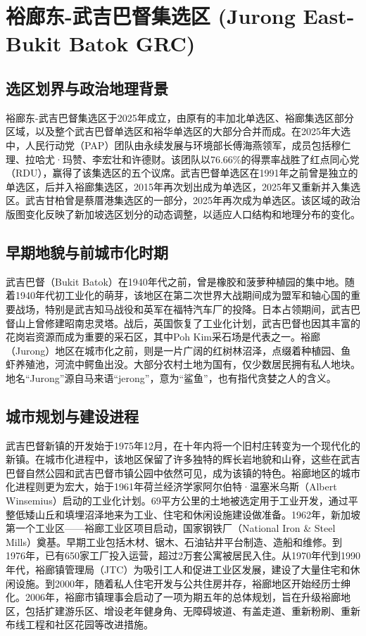 \documentclass[11pt,a4paper,twoside,openany]{book}
\begin{document}
\chapter{裕廊东-武吉巴督集选区 (Jurong East-Bukit Batok GRC)}

\section{选区划界与政治地理背景}
裕廊东-武吉巴督集选区于2025年成立，由原有的丰加北单选区、裕廊集选区部分区域，以及整个武吉巴督单选区和裕华单选区的大部分合并而成。在2025年大选中，人民行动党（PAP）团队由永续发展与环境部长傅海燕领军，成员包括穆仁理、拉哈尤·玛赞、李宏壮和许德财。该团队以76.66\%的得票率战胜了红点同心党（RDU），赢得了该集选区的五个议席。武吉巴督单选区在1991年之前曾是独立的单选区，后并入裕廊集选区，2015年再次划出成为单选区，2025年又重新并入集选区。武吉甘柏曾是蔡厝港集选区的一部分，2025年再次成为单选区。该区域的政治版图变化反映了新加坡选区划分的动态调整，以适应人口结构和地理分布的变化。

\section{早期地貌与前城市化时期}
武吉巴督（Bukit Batok）在1940年代之前，曾是橡胶和菠萝种植园的集中地。随着1940年代初工业化的萌芽，该地区在第二次世界大战期间成为盟军和轴心国的重要战场，特别是武吉知马战役和英军在福特汽车厂的投降。日本占领期间，武吉巴督山上曾修建昭南忠灵塔。战后，英国恢复了工业化计划，武吉巴督也因其丰富的花岗岩资源而成为重要的采石区，其中Poh Kim采石场是代表之一。裕廊（Jurong）地区在城市化之前，则是一片广阔的红树林沼泽，点缀着种植园、鱼虾养殖池，河流中鳄鱼出没。大部分农村土地为国有，仅少数居民拥有私人地块。地名“Jurong”源自马来语“jerong”，意为“鲨鱼”，也有指代贪婪之人的含义。

\section{城市规划与建设进程}
武吉巴督新镇的开发始于1975年12月，在十年内将一个旧村庄转变为一个现代化的新镇。在城市化进程中，该地区保留了许多独特的辉长岩地貌和山脊，这些在武吉巴督自然公园和武吉巴督市镇公园中依然可见，成为该镇的特色。裕廊地区的城市化进程则更为宏大，始于1961年荷兰经济学家阿尔伯特·温塞米乌斯（Albert Winsemius）启动的工业化计划。69平方公里的土地被选定用于工业开发，通过平整低矮山丘和填埋沼泽地来为工业、住宅和休闲设施建设做准备。1962年，新加坡第一个工业区——裕廊工业区项目启动，国家钢铁厂（National Iron \& Steel Mills）奠基。早期工业包括木材、锯木、石油钻井平台制造、造船和维修。到1976年，已有650家工厂投入运营，超过2万套公寓被居民入住。从1970年代到1990年代，裕廊镇管理局（JTC）为吸引工人和促进工业区发展，建设了大量住宅和休闲设施。到2000年，随着私人住宅开发与公共住房并存，裕廊地区开始经历士绅化。2006年，裕廊市镇理事会启动了一项为期五年的总体规划，旨在升级裕廊地区，包括扩建游乐区、增设老年健身角、无障碍坡道、有盖走道、重新粉刷、重新布线工程和社区花园等改进措施。
\end{document}
